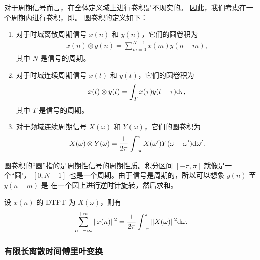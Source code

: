 \begin{definition}[圆卷积]
    对于周期信号而言，在全体定义域上进行卷积是不现实的。
    因此，我们考虑在一个周期内进行卷积，即。
    圆卷积的定义如下：
    \begin{enumerate}
        \item 对于时域离散周期信号 $x(n)$ 和 $y(n)$，它们的圆卷积为
            \begin{align*}
                x(n) \otimes y(n) = \sum_{m = 0}^{N-1}x(m)y(n - m),
            \end{align*}
            其中 $N$ 是信号的周期。
        \item 对于时域连续周期信号 $x(t)$ 和 $y(t)$，它们的圆卷积为
            \begin{align*}
                x(t) \otimes y(t) = \int_{T}x(\tau)y(t - \tau)\mathrm{d}\tau,
            \end{align*}
            其中 $T$ 是信号的周期。
        \item 对于频域连续周期信号 $X(\omega)$ 和 $Y(\omega)$，它们的圆卷积为
            \begin{align*}
                X(\omega) \otimes Y(\omega) = \frac{1}{2\pi}\int_{-\pi}^{\pi}X(\omega')Y(\omega - \omega')\mathrm{d}\omega'.
            \end{align*}
    \end{enumerate}
\end{definition}

\begin{remark}
    圆卷积的``圆''指的是周期性信号的周期性质。积分区间 $[-\pi, \pi]$ 就像是一个``圆'，
    $[0, N-1]$ 也是一个周期。由于信号是周期的，所以可以想象 $y(n)$ 至 $y(n - m)$ 是
    在一个圆上进行逆时针旋转，然后求和。
\end{remark}

\begin{property}
    设 $x(n)$ 的 DTFT 为 $X(\omega)$，则有
    \begin{align*}
        \sum_{n = -\infty}^{+\infty}\|x(n)\|^2 = \frac{1}{2\pi}\int_{-\pi}^{\pi}\|X(\omega)\|^2\mathrm{d}\omega.
    \end{align*}
\end{property}

\subsubsection{有限长离散时间傅里叶变换}

